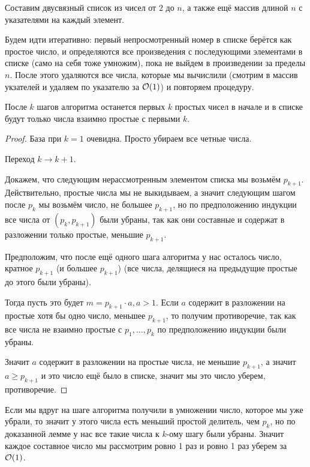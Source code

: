 \documentclass[a4paper, 12pt]{article}
\begin{document}
Составим двусвязный список из чисел от $2$ до $n$, а также ещё массив длиной
$n$ с указателями на каждый элемент.

Будем идти итеративно: первый непросмотренный номер в списке берётся как простое
число, и определяются все произведения с последующими элементами в списке (само на себя тоже умножим), пока
не выйдем в произведении за пределы $n$. После этого удаляются
все числа, которые мы вычислили (смотрим в массив укзателей и удаляем по указателю
за $\mathcal{O}(1)$) и повторяем процедуру.

\begin{Lemma}
После $k$ шагов алгоритма останется первых $k$ простых чисел в начале и в списке
будут только числа взаимно простые с первыми $k$.
\end{Lemma}

\begin{proof}

  База при $k = 1$ очевидна. Просто убираем все четные числа.

  Переход $k \to k + 1$.

  Докажем, что следующим нерассмотренным элементом списка мы возьмём $p_{k + 1}$. Действительно, простые
  числа мы не выкидываем, а значит следующим шагом после $p_k$
  мы возьмём число, не большее $p_{k + 1}$, но по предположению
  индукции все числа от $(p_k, p_{k + 1})$ были убраны, так как
  они составные и содержат в разложении только простые, меньшие $p_{k + 1}$.

  Предположим, что после ещё одного шага алгоритма у нас осталось число, кратное
  $p_{k + 1}$ (и большее $p_{k + 1}$)
  (все числа, делящиеся на предыдущие простые до этого были убраны).

  Тогда пусть это будет $m = p_{k + 1} \cdot a, a > 1$. Если $a$ содержит в разложении
  на простые хотя бы одно число, меньшее $p_{k + 1}$, то получим противоречие, так
  как все числа не взаимно простые с $p_1, \ldots, p_k$ по предположению индукции были убраны.

  Значит $a$ содержит в разложении на простые числа, не меньшие $p_{k + 1}$, а значит
  $a \geqslant p_{k + 1}$ и это число ещё было в списке, значит мы это число уберем, противоречие.
\end{proof}

Если мы вдруг на шаге алгоритма получили в умножении число, которое мы уже убрали, то
значит у этого числа есть меньший простой делитель, чем $p_{k}$, но по доказанной лемме у нас все такие числа к $k$-ому шагу
были убраны. Значит каждое составное число мы рассмотрим ровно 1 раз и ровно
1 раз уберем за $\mathcal{O}(1)$.
\end{document}
